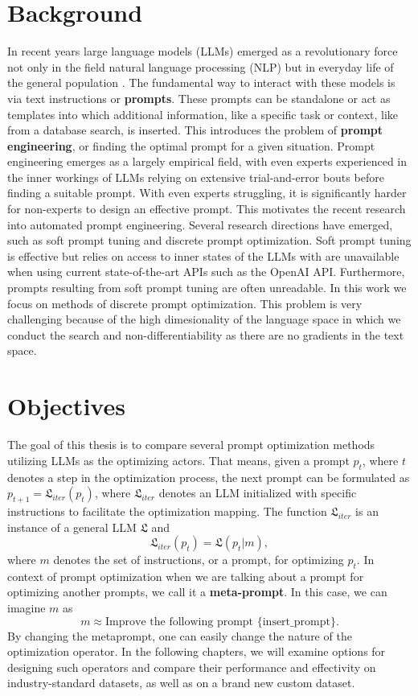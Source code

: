 \section{Background}
In recent years large language models (LLMs) emerged as a revolutionary force not only in the field natural language processing (NLP) but in everyday life of the general population . 
The fundamental way to interact with these models is via text instructions or \textbf{prompts}. These prompts can be standalone or act as templates into which additional information,
like a specific task or context, like from a database search, is inserted. This introduces the problem of \textbf{prompt engineering}, or finding the optimal prompt for a given situation.
Prompt engineering emerges as a largely empirical field, with even experts experienced in the inner workings of LLMs relying on extensive trial-and-error bouts before finding a suitable prompt. 
With even experts struggling, it is significantly harder for non-experts to design an effective prompt. This motivates the recent research into automated prompt engineering. Several research directions have
emerged, such as soft prompt tuning and discrete prompt optimization. Soft prompt tuning is effective but relies on access to inner states of the LLMs with are unavailable when using current state-of-the-art APIs such as
the OpenAI API. Furthermore, prompts resulting from soft prompt tuning are often unreadable. In this work we focus on methods of discrete prompt optimization. This problem is very challenging because of the high dimesionality of the language space in which we
conduct the search and non-differentiability as there are no gradients in the text space.

\section{Objectives}
The goal of this thesis is to compare several prompt optimization methods utilizing LLMs as the optimizing actors. That means, given a prompt $p_t$, where 
$t$ denotes a step in the optimization process, the next prompt can be formulated as $p_{t+1}=\mathfrak{L}_{iter}(p_t)$, where $\mathfrak{L}_{iter}$ denotes
an LLM initialized with specific instructions to facilitate the optimization mapping. The function $\mathfrak{L}_{iter}$ is an instance of a general LLM $\mathfrak{L}$ and 
\begin{equation}
    \mathfrak{L}_{iter}(p_t) = \mathfrak{L}(p_t|m),
\end{equation}
where $m$ denotes the set of instructions, or a prompt, for optimizing $p_t$. In context of prompt optimization when we are talking about a prompt for optimizing another prompts, we call it a \textbf{meta-prompt}.
In this case, we can imagine $m$ as 
\begin{equation*}
    m \approx \text{Improve the following prompt \{insert\_prompt\}}.
\end{equation*}
By changing the metaprompt, one can easily change the nature of the optimization operator. In the following chapters, we will examine options for designing such operators and 
compare their performance and effectivity on industry-standard datasets, as well as on a brand new custom dataset.